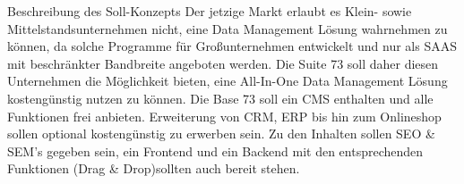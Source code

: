 Beschreibung des Soll-Konzepts
	Der jetzige Markt erlaubt es Klein- sowie Mittelstandsunternehmen nicht, eine Data Management Lösung wahrnehmen zu können, da solche Programme für Großunternehmen entwickelt und nur als SAAS mit beschränkter Bandbreite angeboten werden.
	Die Suite 73 soll daher diesen Unternehmen die Möglichkeit bieten, eine All-In-One Data Management Lösung kostengünstig nutzen zu können.
	Die Base 73 soll ein CMS enthalten und alle Funktionen frei anbieten. Erweiterung von CRM, ERP bis hin zum Onlineshop sollen optional kostengünstig zu erwerben sein.
	Zu den Inhalten sollen SEO \& SEM's gegeben sein, ein Frontend und ein Backend  mit den entsprechenden Funktionen (Drag \& Drop)sollten auch bereit stehen.